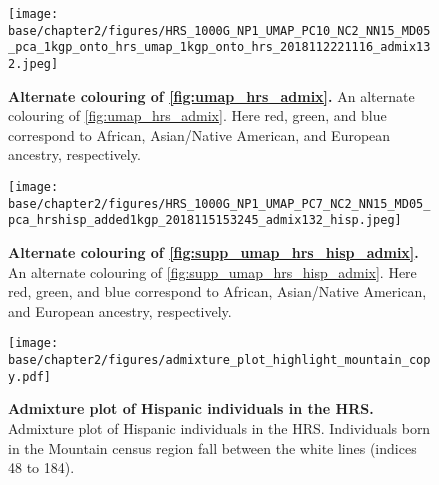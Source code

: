 \newpage

\begin{figure}
\centering
   \texttt{[image: base/chapter2/figures/HRS\_1000G\_NP1\_UMAP\_PC10\_NC2\_NN15\_MD05\_pca\_1kgp\_onto\_hrs\_umap\_1kgp\_onto\_hrs\_2018112221116\_admix132.jpeg]}
   \caption[Alternate colouring of \ref{fig:umap_hrs_admix}]{\textbf{Alternate colouring of \ref{fig:umap_hrs_admix}.} An alternate colouring of \ref{fig:umap_hrs_admix}. Here red, green, and blue correspond to African, Asian/Native American, and European ancestry, respectively.}
    \label{fig:umap_hrs_admix_alt}
\end{figure}

\newpage

\begin{figure}[ht]
    \centering
    \texttt{[image: base/chapter2/figures/HRS\_1000G\_NP1\_UMAP\_PC7\_NC2\_NN15\_MD05\_pca\_hrshisp\_added1kgp\_2018115153245\_admix132\_hisp.jpeg]}
    \caption[An alternate colouring of \ref{fig:supp_umap_hrs_hisp_admix}]{\textbf{Alternate colouring of \ref{fig:supp_umap_hrs_hisp_admix}.} An alternate colouring of \ref{fig:supp_umap_hrs_hisp_admix}. Here red, green, and blue correspond to African, Asian/Native American, and European ancestry, respectively.}
    \label{fig:supp_umap_hrs_hisp_admix_alt}
\end{figure}

\newpage

\begin{figure}[ht]
    \centering
    \texttt{[image: base/chapter2/figures/admixture\_plot\_highlight\_mountain\_copy.pdf]}
    \caption[Admixture plot of Hispanic individuals in the HRS]{\textbf{Admixture plot of Hispanic individuals in the HRS.} Admixture plot of Hispanic individuals in the HRS. Individuals born in the Mountain census region fall between the white lines (indices 48 to 184).}
    \label{fig:supp_hrs_hisp_admix}
\end{figure}

\clearpage

